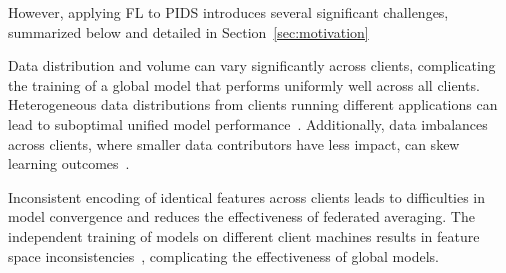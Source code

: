 However, applying FL to PIDS introduces several significant challenges, summarized below and detailed in Section~\ref{sec:motivation}

\begin{enumerate}[itemsep=0.1em, parsep=0em, topsep=0em]
   Data distribution and volume can vary significantly across clients, complicating the training of a global model that performs uniformly well across all clients. Heterogeneous data distributions from clients running different applications can lead to suboptimal unified model performance~\cite{qu2022rethinking}. Additionally, data imbalances across clients, where smaller data contributors have less impact, can skew learning outcomes~\cite{duan2020self}.

   Inconsistent encoding of identical features across clients leads to difficulties in model convergence and reduces the effectiveness of federated averaging. The independent training of \wordvec models on different client machines results in feature space inconsistencies~\cite{zhou2023fedfa}, complicating the effectiveness of global \gnnshort models.

  
\end{enumerate}



